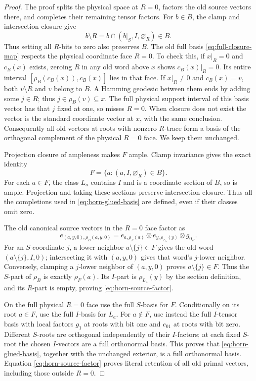 \documentclass[11pt]{article}
\theoremstyle{definition}
\begin{document}
\begin{proof}
The proof splits the physical space at $R=0$, factors the old source
vectors there, and completes their remaining tensor factors.
For $b\in B$, the clamp and intersection closure give
\[
 b\setminus R=b\cap(b|_S,I,\varnothing_R)\in B.
\]
Thus setting all $R$-bits to zero also preserves $B$.
The old full basis \eqref{eq:full-closure-map} respects the physical
coordinate face $R=0$. To check this, if $x|_R=0$ and $c_B(x)$ exists,
zeroing $R$ in any old word above $x$ shows $c_B(x)|_R=0$.
Its entire interval $[\rho_B(c_B(x)),c_B(x)]$ lies in that face.
If $x|_R\ne0$ and $c_B(x)=v$, both $v\setminus R$ and $v$ belong
to $B$. A Hamming geodesic between them ends by adding some $j\in R$;
thus $j\in\rho_B(v)\subseteq x$. The full physical support interval
of this basis vector has that $j$ fixed at one, so misses $R=0$.
When closure does not exist the vector is the standard coordinate vector
at $x$, with the same conclusion. Consequently all old vectors at
roots with nonzero $R$-trace form a basis of the orthogonal complement
of the physical $R=0$ face. We keep them unchanged.

Projection closure of ampleness makes $F$ ample. Clamp invariance gives
the exact identity
\[
 F=\{a:(a,I,\varnothing_R)\in B\}.
\]
For each $a\in F$, the class $L_a$ contains $I$ and is a coordinate
section of $B$, so is ample. Projection and taking these sections
preserve intersection closure. Thus all the completions used in
\eqref{eq:horn-glued-basis} are defined, even if their classes omit zero.

The old canonical source vectors in the $R=0$ face factor as
\begin{equation}\label{eq:horn-source-factor}
 e_{(a,y,0),\rho_B(a,y,0)}
    = e_{a,\rho_F(a)}\otimes e_{y,\rho_{L_a}(y)}\otimes g_{0_R}.
\end{equation}
For an $S$-coordinate $j$, a lower neighbor $a\setminus\{j\}\in F$
gives the old word $(a\setminus\{j\},I,0)$; intersecting it with
$(a,y,0)$ gives that word's $j$-lower neighbor. Conversely, clamping
a $j$-lower neighbor of $(a,y,0)$ proves
$a\setminus\{j\}\in F$. Thus the $S$-part of $\rho_B$ is exactly
$\rho_F(a)$. Its $I$-part is $\rho_{L_a}(y)$ by the section definition,
and its $R$-part is empty, proving \eqref{eq:horn-source-factor}.

On the full physical $R=0$ face use the full $S$-basis for $F$.
Conditionally on its root $a\in F$, use the full $I$-basis for $L_a$.
For $a\notin F$, use instead the full $I$-tensor basis with local factors
$g_1$ at roots with bit one and $e_{01}$ at roots with bit zero.
Different $S$-roots are orthogonal independently of their $I$-factors;
at each fixed $S$-root the chosen $I$-vectors are a full orthonormal
basis. This proves that \eqref{eq:horn-glued-basis}, together with the
unchanged exterior, is a full orthonormal basis. Equation
\eqref{eq:horn-source-factor} proves literal retention of all old primal
vectors, including those outside $R=0$.


\end{proof}
\end{document}
